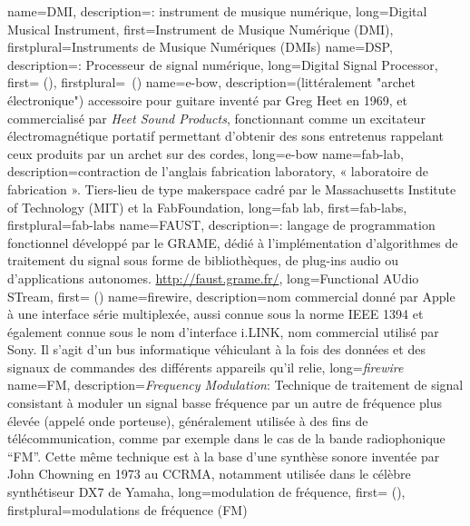 {
    name={DMI},
    description={\textit{}: instrument de musique numérique},
    long={Digital Musical Instrument},
    first={Instrument de Musique Numérique (DMI)},
    firstplural={Instruments de Musique Numériques (DMIs)}
}
{
    name={DSP},
    description={\textit{}: Processeur de signal numérique},
    long={Digital Signal Processor},
    first={ ()},
    firstplural={\glspluralsuffix\ (\glspluralsuffix)}
}
{
    name={e-bow},
    description={(littéralement "archet électronique") accessoire pour guitare inventé par Greg Heet en 1969, et commercialisé par \textit{Heet Sound Products}, fonctionnant comme un excitateur électromagnétique portatif permettant d'obtenir des sons entretenus rappelant ceux produits par un archet sur des cordes},
    long={e-bow}
}
{
    name={fab-lab},
    description={contraction de l'anglais fabrication laboratory, « laboratoire de fabrication ». Tiers-lieu de type \gls{makerspace} cadré par le Massachusetts Institute of Technology (MIT) et la FabFoundation},
    long={fab lab},
    first={fab-labs},
    firstplural={fab-labs}
}
{
    name={FAUST},
    description={\textit{}: langage de programmation fonctionnel développé par le \gls{GRAME}, dédié à l'implémentation d'algorithmes de traitement du signal sous forme de bibliothèques, de plug-ins audio ou d'applications autonomes. \url{http://faust.grame.fr/}},
    long={Functional AUdio STream},
    first={ ()}
}
{
    name={firewire},
    description={nom commercial donné par Apple à une interface série multiplexée, aussi connue sous la norme IEEE 1394 et également connue sous le nom d'interface i.LINK, nom commercial utilisé par Sony. Il s'agit d'un bus informatique véhiculant à la fois des données et des signaux de commandes des différents appareils qu'il relie},
    long={\textit{firewire}}
}
{
    name={FM},
    description={\textit{Frequency Modulation}: Technique de traitement de signal consistant à moduler un signal basse fréquence par un autre de fréquence plus élevée (appelé onde porteuse), généralement utilisée à des fins de télécommunication, comme par exemple dans le cas de la bande radiophonique ``FM''. Cette même technique est à la base d'une synthèse sonore inventée par John Chowning en 1973 au \gls{CCRMA}, notamment utilisée dans le célèbre synthétiseur DX7 de Yamaha},
    long={modulation de fréquence},
    first={ ()},
    firstplural={modulations de fréquence (FM)}
}
